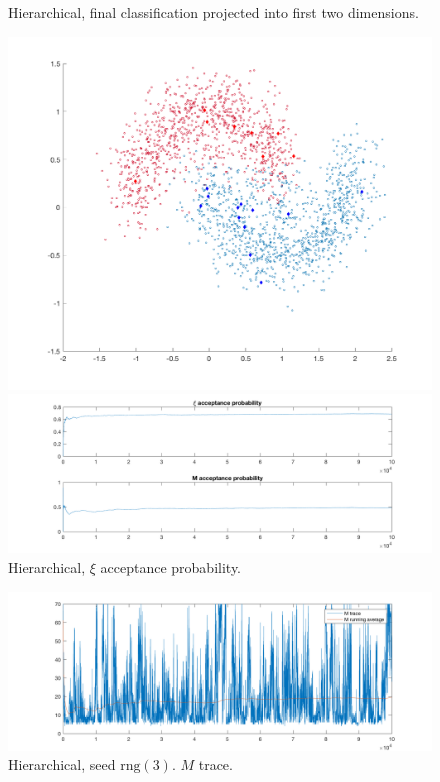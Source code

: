 \documentclass{siamart1116}
\begin{document}
            \begin{figure}[!htb]
            \begin{minipage}{0.48\textwidth}
                \centering
                \caption{\label{fig:moons_hier_scatter} Hierarchical, final classification projected into first two dimensions.}
                \includegraphics[width=\linewidth]{learnM/moons/hier/sigma_0_20/scatter.png}
            \end{minipage} \hfill
            \begin{minipage}{0.48\textwidth}
                \centering
                \caption{\label{fig:moons_hier_M_xi_accept} Hierarchical, $\xi$ acceptance probability.}
                \includegraphics[width=\linewidth]{learnM/moons/hier/sigma_0_20/accept_prob.png}
            \end{minipage}
            \end{figure}

            \begin{figure}[!htb]
                \centering
                \caption{\label{fig:moons_hier_M_trace} Hierarchical, seed $\text{rng}(3)$. $M$ trace.}
                \includegraphics[width=0.6\linewidth]{learnM/moons/hier/sigma_0_20/M_trace.png}
            \end{figure}
\end{document}
